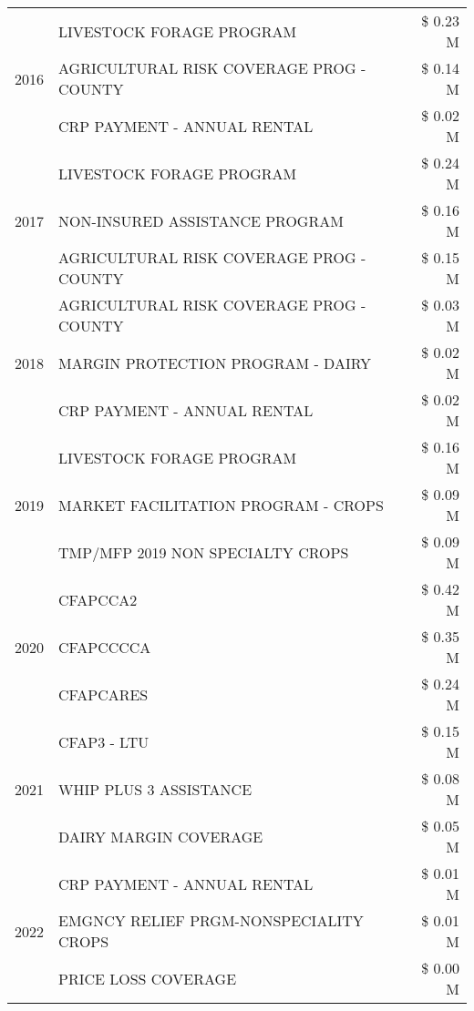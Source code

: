 \begin{tabular}{llr}
\cline{1-3}
\multirow[t]{3}{*}{2016} & LIVESTOCK FORAGE PROGRAM & \$ 0.23 M \\
 & AGRICULTURAL RISK COVERAGE PROG - COUNTY & \$ 0.14 M \\
 & CRP PAYMENT - ANNUAL RENTAL & \$ 0.02 M \\
\cline{1-3}
\multirow[t]{3}{*}{2017} & LIVESTOCK FORAGE PROGRAM & \$ 0.24 M \\
 & NON-INSURED ASSISTANCE PROGRAM & \$ 0.16 M \\
 & AGRICULTURAL RISK COVERAGE PROG - COUNTY & \$ 0.15 M \\
\cline{1-3}
\multirow[t]{3}{*}{2018} & AGRICULTURAL RISK COVERAGE PROG - COUNTY & \$ 0.03 M \\
 & MARGIN PROTECTION PROGRAM - DAIRY & \$ 0.02 M \\
 & CRP PAYMENT - ANNUAL RENTAL & \$ 0.02 M \\
\cline{1-3}
\multirow[t]{3}{*}{2019} & LIVESTOCK FORAGE PROGRAM & \$ 0.16 M \\
 & MARKET FACILITATION PROGRAM - CROPS & \$ 0.09 M \\
 & TMP/MFP 2019 NON SPECIALTY CROPS & \$ 0.09 M \\
\cline{1-3}
\multirow[t]{3}{*}{2020} & CFAPCCA2 & \$ 0.42 M \\
 & CFAPCCCCA & \$ 0.35 M \\
 & CFAPCARES & \$ 0.24 M \\
\cline{1-3}
\multirow[t]{3}{*}{2021} & CFAP3 - LTU & \$ 0.15 M \\
 & WHIP PLUS 3 ASSISTANCE & \$ 0.08 M \\
 & DAIRY MARGIN COVERAGE & \$ 0.05 M \\
\cline{1-3}
\multirow[t]{3}{*}{2022} & CRP PAYMENT - ANNUAL RENTAL & \$ 0.01 M \\
 & EMGNCY RELIEF PRGM-NONSPECIALITY CROPS & \$ 0.01 M \\
 & PRICE LOSS COVERAGE & \$ 0.00 M \\
\cline{1-3}
\bottomrule
\end{tabular}
